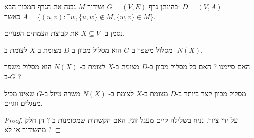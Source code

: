 בהינתן גרף 
$G = (V, E)$
ושידוך $M$ נבנה את הגרף המכוון הבא:
$D = (V, A)$
\\
כאשר 
$A = \{(u, v) : \exists w, \{u, w\} \notin M, \{w, v\} \in M\}$.
\begin{figure}[h]
\centering

\end{figure}
נסמן ב-%
$X \subseteq V$
את קבוצת הצמתים הפנויים.
\begin{claim}
מסלול משפר ב-$G$ הוא מסלול מכוון ב-$D$ מצומת ב-$X$ לצומת ב-%
$N(X)$.
\end{claim}
האם סיימנו ? האם כל מסלול מכוון ב-$D$ מצומת ב-$X$ לצומת ב-%
$N(X)$
הוא מסלול משפר ב-$G$ ?
\begin{claim}
מסלול מכוון קצר ביותר ב-$D$ מצומת ב-$X$ לצומת ב-%
$N(X)$
משרה טיול ב-$G$ שאינו מכיל מעגלים זוגיים.
\end{claim}

\begin{proof}
על ידי ציור. 
נניח בשלילה קיים מעגל זוגי, האם הקשתות שמסומנות ב-? הן חלק מהשידוך או לא ?
\end{proof}

\begin{figure}[h]
\centering

\end{figure}
